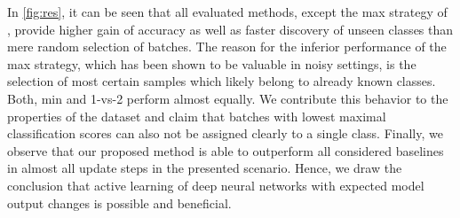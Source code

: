 \documentclass{article}
\begin{document}
In \cref{fig:res}, it can be seen that all evaluated methods, except the max strategy of \cite{krause2015unreasonable},
provide higher gain of accuracy as well as faster discovery of unseen classes than mere random selection of batches.
The reason for the inferior performance of the max strategy, which has been shown to be valuable in noisy settings, is the selection of most certain samples which likely belong to already known classes.
Both, min \cite{novotny16i-have} and 1-vs-2 \cite{wang2016cost} perform almost equally.
We contribute this behavior to the properties of the dataset and claim that batches with lowest maximal classification scores can also not be assigned clearly to a single class.
Finally, we observe that our proposed method is able to outperform all considered baselines in almost all update steps in the presented scenario.
Hence, we draw the conclusion that active learning of deep neural networks with expected model output changes is possible and beneficial.
\newlength{\updatesizewidth}%
\newlength{\updatesizeheight}%
\setlength{\updatesizewidth}{.35\textwidth}%
\setlength{\updatesizeheight}{.13\textheight}%
\newlength{\XLabelDistupdatesize}%
\newlength{\YLabelDistupdatesize}%
\setlength{\XLabelDistupdatesize}{-3pt}%
\setlength{\YLabelDistupdatesize}{-3pt}%
\newlength{\updatesizeColSepLegend}
\setlength{\updatesizeColSepLegend}{6pt}%
\newlength{\lwupdatesize}
\newlength{\lwupdatesizeplot}
\setlength{\lwupdatesize}{1.0pt}%
\setlength{\lwupdatesizeplot}{2.5pt}%
\newlength{\mytikzplotColSepLegend}
\setlength{\mytikzplotColSepLegend}{8pt}
\end{document}
